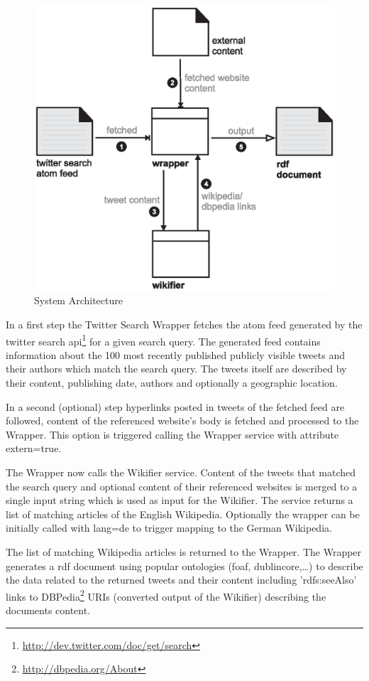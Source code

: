 \documentclass{llncs}
\begin{document}
\begin{figure}[htb]
  \centering
  \includegraphics[width=.6\linewidth]{architecture}
  \caption{System Architecture}
  \label{fig:arch}
\end{figure}

In a first step the Twitter Search Wrapper fetches the atom feed
generated by the twitter search
api\footnote{\url{http://dev.twitter.com/doc/get/search}} for a given search
query. The generated feed contains information about the 100 most recently published publicly visible tweets and
their authors which match the search query. The tweets itself are described by
their content, publishing date, authors and optionally a geographic location. 

In a second (optional) step hyperlinks posted in tweets of the fetched
feed are followed, content of the referenced website's body is fetched and
processed to the Wrapper. This option is triggered calling the Wrapper
service with attribute extern=true.

The Wrapper now calls the Wikifier \cite{key:wikifier} service. Content of the
tweets that matched the search query and optional content of their referenced websites is merged
to a single input string which is used as input for the Wikifier. The service
returns a list of matching articles of the English
Wikipedia. Optionally the wrapper can be initially called with lang=de to
trigger mapping to the German Wikipedia.

The list of matching Wikipedia articles is returned to the Wrapper. The Wrapper
generates a rdf document using popular ontologies (foaf, dublincore,\ldots) to
describe the data related to the returned tweets and their content including 'rdfs:seeAlso' links to
DBPedia\footnote{\url{http://dbpedia.org/About}} URIs (converted output of the
Wikifier) describing the documents content.
\end{document}
